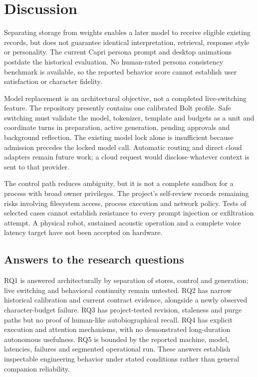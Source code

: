 \documentclass[11pt,a4paper]{article}
\begin{document}
\section{Discussion}
Separating storage from weights enables a later model to receive eligible existing records, but does not guarantee identical interpretation, retrieval, response style or personality. The current Capri persona prompt and desktop animations postdate the historical evaluation. No human-rated persona consistency benchmark is available, so the reported behavior score cannot establish user satisfaction or character fidelity.

Model replacement is an architectural objective, not a completed live-switching feature. The repository presently contains one calibrated Bolt profile. Safe switching must validate the model, tokenizer, template and budgets as a unit and coordinate turns in preparation, active generation, pending approvals and background reflection. The existing model lock alone is insufficient because admission precedes the locked model call. Automatic routing and direct cloud adapters remain future work; a cloud request would disclose whatever context is sent to that provider.

The control path reduces ambiguity, but it is not a complete sandbox for a process with broad owner privileges. The project's self-review records remaining risks involving filesystem access, process execution and network policy. Tests of selected cases cannot establish resistance to every prompt injection or exfiltration attempt. A physical robot, sustained acoustic operation and a complete voice latency target have not been accepted on hardware.


\subsection{Answers to the research questions}
RQ1 is answered architecturally by separation of stores, control and generation; live switching and behavioral continuity remain untested. RQ2 has narrow historical calibration and current contract evidence, alongside a newly observed character-budget failure. RQ3 has project-tested revision, staleness and purge paths but no proof of human-like autobiographical recall. RQ4 has explicit execution and attention mechanisms, with no demonstrated long-duration autonomous usefulness. RQ5 is bounded by the reported machine, model, latencies, failures and segmented operational run. These answers establish inspectable engineering behavior under stated conditions rather than general companion reliability.
\end{document}
